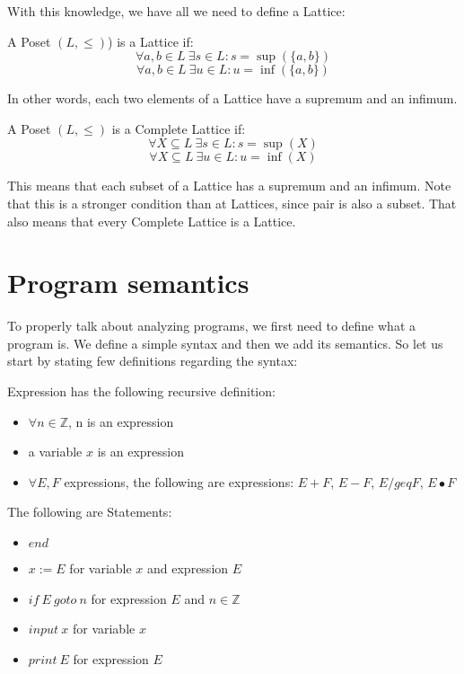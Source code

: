 With this knowledge, we have all we need to define a Lattice:
\begin{defn}[Lattice]
    A Poset $(L, \leq)$) is a Lattice if:
    \[\forall a, b \in L \: \exists s \in L: s = \sup(\{a,b\})\]
    \[\forall a, b \in L \: \exists u \in L: u = \inf(\{a,b\})\]
\end{defn}

In other words, each two elements of a Lattice have a supremum and an infimum.

\begin{defn}
    A Poset $(L, \leq)$ is a Complete Lattice if:
    \[\forall X \subseteq L \: \exists s \in L: s = \sup(X)\]
    \[\forall X \subseteq L \: \exists u \in L: u = \inf(X)\]
\end{defn}

This means that each subset of a Lattice has a supremum and an infimum.
Note that this is a stronger condition than at Lattices, since pair is also a subset.
That also means that every Complete Lattice is a Lattice.





\section{Program semantics} %

To properly talk about analyzing programs, we first need to define what a program is.
We define a simple syntax and then we add its semantics.
So let us start by stating few definitions regarding the syntax:

\begin{defn}[Expression]
    Expression has the following recursive definition:
    \begin{itemize}
        \item $\forall n \in \mathbb{Z}$, n is an expression
        \item a variable $x$ is an expression
        \item $\forall E, F$ expressions, the following are expressions: $E+F$, $E-F$, $E/geq F$, $E \bullet F$
    \end{itemize}
\end{defn}

\begin{defn}[Statement]
    The following are Statements:
    \begin{itemize}
        \item $end$
        \item $x := E$ for variable $x$ and expression $E$
        \item $if \: E \: goto \: n$ for expression $E$ and $n \in \mathbb{Z}$
        \item $input \: x$ for variable $x$
        \item $print \: E$ for expression $E$
    \end{itemize}
\end{defn}

